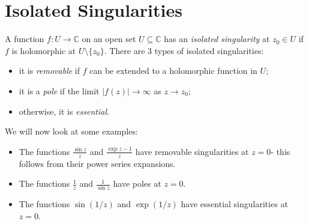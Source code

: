 \documentclass[a4paper, openany]{memoir}
\theoremstyle{definition}
\theoremstyle{plain}
\begin{document}
    \section{Isolated Singularities}
    A function $f \colon U \to \mathbb{C}$ on an open set $U \subseteq \mathbb{C}$ has an \emph{isolated singularity} at $z_0 \in U$ if $f$ is holomorphic at $U \setminus \{z_0\}$. There are 3 types of isolated singularities:
    \begin{itemize}
        \item it is \emph{removable} if $f$ can be extended to a holomorphic function in $U$;
        \item it is a \emph{pole} if the limit $|f(z)| \to \infty$ as $z \to z_0$;
        \item otherwise, it is \emph{essential}.
    \end{itemize}
    We will now look at some examples:
    \begin{itemize}
        \item The functions $\frac{\sin z}{z}$ and $\frac{\exp z - 1}{z}$ have removable singularities at $z = 0$- this follows from their power series expansions. 
        \item The functions $\frac{1}{z}$ and $\frac{1}{\sin z}$ have poles at $z = 0$. 
        \item The functions $\sin (1/z)$ and $\exp (1/z)$ have essential singularities at $z = 0$.
    \end{itemize}
\end{document}
